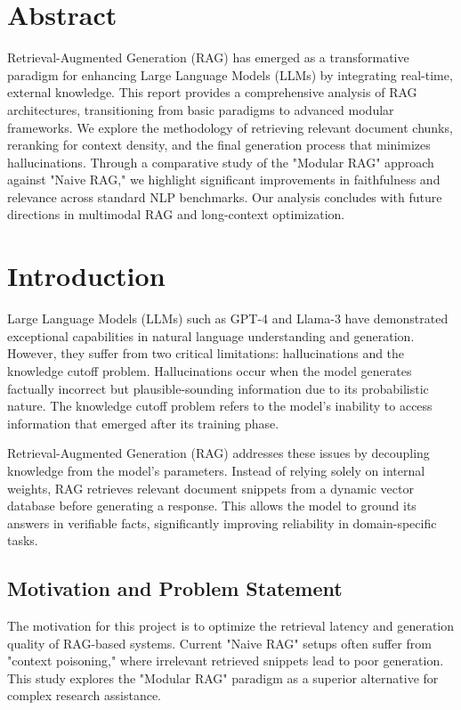 \documentclass[11pt,a4paper,oneside]{report}
\begin{document}
\chapter*{Abstract}
Retrieval-Augmented Generation (RAG) has emerged as a transformative paradigm for enhancing Large Language Models (LLMs) by integrating real-time, external knowledge. This report provides a comprehensive analysis of RAG architectures, transitioning from basic paradigms to advanced modular frameworks. We explore the methodology of retrieving relevant document chunks, reranking for context density, and the final generation process that minimizes hallucinations. Through a comparative study of the "Modular RAG" approach against "Naive RAG," we highlight significant improvements in faithfulness and relevance across standard NLP benchmarks. Our analysis concludes with future directions in multimodal RAG and long-context optimization.

\tableofcontents
\listoffigures
\listoftables

\clearpage
{}

\chapter{Introduction}
\label{ch:intro}

Large Language Models (LLMs) such as GPT-4 and Llama-3 have demonstrated exceptional capabilities in natural language understanding and generation. However, they suffer from two critical limitations: hallucinations and the knowledge cutoff problem. Hallucinations occur when the model generates factually incorrect but plausible-sounding information due to its probabilistic nature. The knowledge cutoff problem refers to the model's inability to access information that emerged after its training phase.

Retrieval-Augmented Generation (RAG) addresses these issues by decoupling knowledge from the model's parameters. Instead of relying solely on internal weights, RAG retrieves relevant document snippets from a dynamic vector database before generating a response. This allows the model to ground its answers in verifiable facts, significantly improving reliability in domain-specific tasks.

\section{Motivation and Problem Statement}
The motivation for this project is to optimize the retrieval latency and generation quality of RAG-based systems. Current "Naive RAG" setups often suffer from "context poisoning," where irrelevant retrieved snippets lead to poor generation. This study explores the "Modular RAG" paradigm as a superior alternative for complex research assistance.
\end{document}
